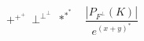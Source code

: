 \documentclass{article}
\begin{document}
$$+^{+^+}\ \perp^{\perp^\perp}\ *^{*^*}\quad\frac{|P_{F^\perp}(K)|}{e^{(x+y)^*}}$$
\end{document}
